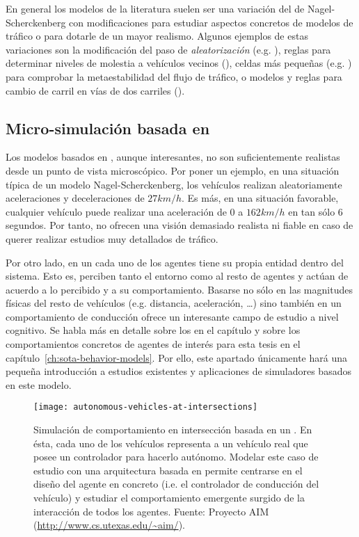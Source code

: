 En general los modelos de la literatura suelen ser una variación del de Nagel-Scherckenberg con modificaciones para estudiar aspectos concretos de modelos de tráfico o para dotarle de un mayor realismo. Algunos ejemplos de estas variaciones son la modificación del paso de \textit{aleatorización} (e.g. \cite{Barlovic1998}), reglas para determinar niveles de molestia a vehículos vecinos (\cite{Wagner1997}), celdas más pequeñas (e.g. \cite{Krauss1997}) para comprobar la metaestabilidad del flujo de tráfico, o modelos y reglas para cambio de carril en vías de dos carriles (\cite{Brilon1999, Nagel1998}).

\subsection{Micro-simulación basada en }

Los modelos basados en , aunque interesantes, no son suficientemente realistas desde un punto de vista microscópico. Por poner un ejemplo, en una situación típica de un modelo Nagel-Scherckenberg, los vehículos realizan aleatoriamente aceleraciones y deceleraciones de $27 km/h$. Es más, en una situación favorable, cualquier vehículo puede realizar una aceleración de $0$ a $162km/h$ en tan sólo $6$ segundos. Por tanto, no ofrecen una visión demasiado realista ni fiable en caso de querer realizar estudios muy detallados de tráfico.

Por otro lado, en un  cada uno de los agentes tiene su propia entidad dentro del sistema. Esto es, perciben tanto el entorno como al resto de agentes y actúan de acuerdo a lo percibido y a su comportamiento. Basarse no sólo en las magnitudes físicas del resto de vehículos (e.g. distancia, aceleración, \ldots) sino también en un comportamiento de conducción ofrece un interesante campo de estudio a nivel cognitivo. Se habla más en detalle sobre los  en el capítulo  y sobre los comportamientos concretos de agentes de interés para esta tesis en el capítulo~\ref{ch:sota-behavior-models}. Por ello, este apartado únicamente hará una pequeña introducción a estudios existentes y aplicaciones de simuladores basados en este modelo.

\begin{figure}[t]
	\centering
	\texttt{[image: autonomous-vehicles-at-intersections]}
	\caption[Simulación de comportamiento en intersección basada en un ]{Simulación de comportamiento en intersección basada en un . En ésta, cada uno de los vehículos representa a un vehículo real que posee un controlador para hacerlo autónomo. Modelar este caso de estudio con una arquitectura basada en  permite centrarse en el diseño del agente en concreto (i.e. el controlador de conducción del vehículo) y estudiar el comportamiento emergente surgido de la interacción de todos los agentes. Fuente: Proyecto AIM (\url{http://www.cs.utexas.edu/~aim/}).}
	\label{fig:autonomous-vehicles-at-intersections}
\end{figure}


